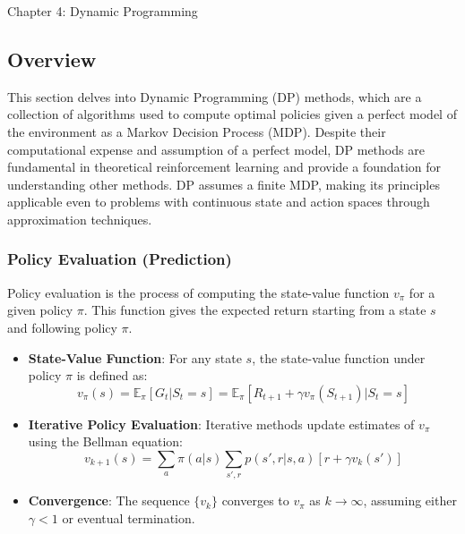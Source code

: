 \begin{notes}{Chapter 4: Dynamic Programming}
    \subsection*{Overview}

    This section delves into Dynamic Programming (DP) methods, which are a collection of algorithms used to compute optimal policies given a perfect model of the environment as a Markov Decision Process 
    (MDP). Despite their computational expense and assumption of a perfect model, DP methods are fundamental in theoretical reinforcement learning and provide a foundation for understanding other methods. 
    DP assumes a finite MDP, making its principles applicable even to problems with continuous state and action spaces through approximation techniques.
    
    \subsubsection*{Policy Evaluation (Prediction)}
    
    Policy evaluation is the process of computing the state-value function \(v_\pi\) for a given policy \(\pi\). This function gives the expected return starting from a state \(s\) and following policy \(\pi\).
    
    \begin{highlight}
    
        \begin{itemize}
            \item \textbf{State-Value Function}: For any state \(s\), the state-value function under policy \(\pi\) is defined as:
            \[
            v_\pi(s) = \mathbb{E}_\pi [G_t | S_t = s] = \mathbb{E}_\pi [R_{t+1} + \gamma v_\pi(S_{t+1}) | S_t = s]
            \]
            \item \textbf{Iterative Policy Evaluation}: Iterative methods update estimates of \(v_\pi\) using the Bellman equation:
            \[
            v_{k+1}(s) = \sum_a \pi(a|s) \sum_{s', r} p(s', r | s, a) \left[ r + \gamma v_k(s') \right]
            \]
            \item \textbf{Convergence}: The sequence \(\{v_k\}\) converges to \(v_\pi\) as \(k \to \infty\), assuming either \(\gamma < 1\) or eventual termination.
        \end{itemize}
    
    \end{highlight}
    

\end{notes}
